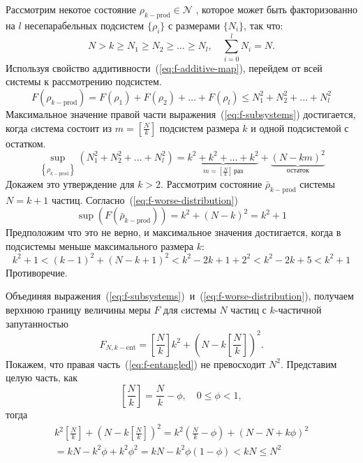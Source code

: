 Рассмотрим некотое состояние $\rho_{k-\mathrm{prod}} \in \mathcal{N}$ , 
которое может быть факторизованно на $l$ несепарабельных подсистем $\{\rho_i\}$ с размерами $\{N_i\}$, так что: 
\begin{equation}
  N > k \geq N_1 \geq N_2 \geq \dots \geq N_l, \quad \sum_{i=0}^{l} N_i = N. 
\end{equation}
%
Используя свойство аддитивности~(\ref{eq:f-additive-map}),
перейдем от всей системы к рассмотрению подсистем.
%
\begin{equation}\label{eq:f-subsystems}
  F(\rho_{k-\mathrm{prod}}) = 
  F(\rho_1) + F(\rho_2) + \dots + F(\rho_l)
  \leq N^2_1 + N^2_2 + \dots + N^2_l
\end{equation}
%
Максимальное значение правой части выражения~(\ref{eq:f-subsystems}) достигается, 
когда cистема состоит из $m = \left[\frac N k \right]$ подсистем размера $k$
и одной подсистемой с остатком. 
% 
\begin{equation}\label{eq:f-worse-distribution}
  \sup_{\left\{\rho_{k-\mathrm{prod}}\right\}}
    \left(N^2_1 + N^2_2 + \dots + N^2_l\right)
  = \underbrace{
    k^2 + k^2 + \dots + k^2
    }_{m = \left[\frac N k \right] \, \mbox{раз}} 
    + \underbrace{(N-km)^2}_{\mbox{остаток}}
\end{equation}
%
Докажем это утверждение для $k > 2$.  
Рассмотрим состояние $\bar\rho_{k-\mathrm{prod}}$ системы  $N=k+1$ частиц.
Согласно~(\ref{eq:f-worse-distribution})  
\begin{equation}
  \sup(F(\bar\rho_{k-\mathrm{prod}})) = k^2 + (N - k)^2 = k^2 + 1
\end{equation}
Предположим что это не верно, 
и максимальное значения достигается, когда в подсистемы меньше максимального размера $k$:
\begin{equation}
  k^2 + 1 < (k-1)^2 + (N - k + 1)^2 < k^2 - 2k + 1 + 2^2 < k^2 - 2k + 5 < k^2 + 1
\end{equation}
Противоречие. 

Объединяя выражения~(\ref{eq:f-subsystems})~и~(\ref{eq:f-worse-distribution}), 
получаем верхнюю границу величины меры $F$ для cистемы $N$ частиц с $k$-частичной запутанностью
%
\begin{equation}\label{eq:f-entangled}
  F_{N, k-\mathrm{ent}} = \left[ \frac N k \right] k^2 + \left(N - k \left[ \frac N k \right]\right)^2.
\end{equation}
%
Покажем, что правая часть~(\ref{eq:f-entangled}) не превосходит $N^2$.
Представим целую часть, как 
\begin{equation}
  \left[\frac{N}{k}\right] = \frac{N}{k} -\phi,\quad 0 \leq \phi < 1,
\end{equation} 
тогда
%
\begin{multline}
  k^2\left[\frac{N}{k}\right] + (N-k\left[\frac{N}{k}\right])^2 
  = k^2\left(\frac{N}{k} - \phi\right) + (N - N +k\phi)^2 \\
  = kN - k^2 \phi +k^2 \phi^2 = kN - k^2 \phi(1- \phi) < kN \leq N^2 
\end{multline}



